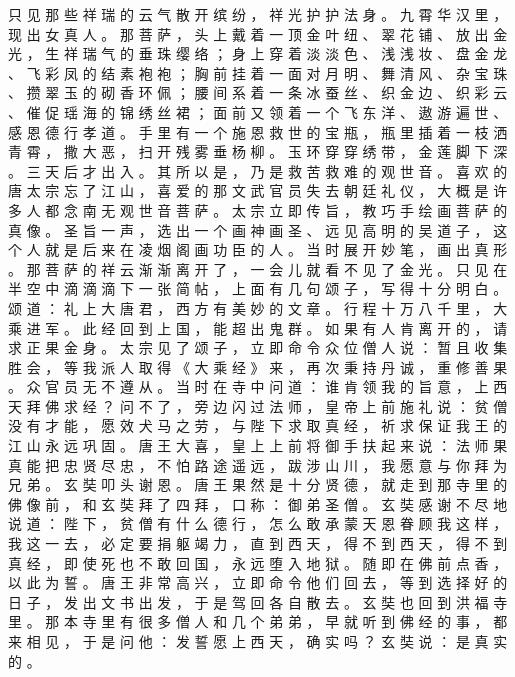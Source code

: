 {只 见 那 些 祥 瑞 的 云 气 散 开 缤 纷 ， 祥 光 护 护 法 身 。
九 霄 华 汉 里 ， 现 出 女 真 人 。
那 菩 萨 ， 头 上 戴 着 一 顶 金 叶 纽 、 翠 花 铺 、 放 出 金 光 ， 生 祥 瑞 气 的 垂 珠 缨 络 ； 身 上 穿 着 淡 淡 色 、 浅 浅 妆 、 盘 金 龙 、 飞 彩 凤 的 结 素 袍 袍 ； 胸 前 挂 着 一 面 对 月 明 、 舞 清 风 、 杂 宝 珠 、 攒 翠 玉 的 砌 香 环 佩 ； 腰 间 系 着 一 条 冰 蚕 丝 、 织 金 边 、 织 彩 云 、 催 促 瑶 海 的 锦 绣 丝 裙 ； 面 前 又 领 着 一 个 飞 东 洋 、 遨 游 遍 世 、 感 恩 德 行 孝 道 。
手 里 有 一 个 施 恩 救 世 的 宝 瓶 ， 瓶 里 插 着 一 枝 洒 青 霄 ， 撒 大 恶 ， 扫 开 残 雾 垂 杨 柳 。
玉 环 穿 穿 绣 带 ， 金 莲 脚 下 深 。
三 天 后 才 出 入 。
其 所 以 是 ， 乃 是 救 苦 救 难 的 观 世 音 。
喜 欢 的 唐 太 宗 忘 了 江 山 ， 喜 爱 的 那 文 武 官 员 失 去 朝 廷 礼 仪 ， 大 概 是 许 多 人 都 念 南 无 观 世 音 菩 萨 。
太 宗 立 即 传 旨 ， 教 巧 手 绘 画 菩 萨 的 真 像 。
圣 旨 一 声 ， 选 出 一 个 画 神 画 圣 、 远 见 高 明 的 吴 道 子 ， 这 个 人 就 是 后 来 在 凌 烟 阁 画 功 臣 的 人 。
当 时 展 开 妙 笔 ， 画 出 真 形 。
那 菩 萨 的 祥 云 渐 渐 离 开 了 ， 一 会 儿 就 看 不 见 了 金 光 。
只 见 在 半 空 中 滴 滴 滴 下 一 张 简 帖 ， 上 面 有 几 句 颂 子 ， 写 得 十 分 明 白 。
颂 道 ： 礼 上 大 唐 君 ， 西 方 有 美 妙 的 文 章 。
行 程 十 万 八 千 里 ， 大 乘 进 军 。
此 经 回 到 上 国 ， 能 超 出 鬼 群 。
如 果 有 人 肯 离 开 的 ， 请 求 正 果 金 身 。
太 宗 见 了 颂 子 ， 立 即 命 令 众 位 僧 人 说 ： 暂 且 收 集 胜 会 ， 等 我 派 人 取 得 《 大 乘 经 》 来 ， 再 次 秉 持 丹 诚 ， 重 修 善 果 。
众 官 员 无 不 遵 从 。
当 时 在 寺 中 问 道 ： 谁 肯 领 我 的 旨 意 ， 上 西 天 拜 佛 求 经 ？ 问 不 了 ， 旁 边 闪 过 法 师 ， 皇 帝 上 前 施 礼 说 ： 贫 僧 没 有 才 能 ， 愿 效 犬 马 之 劳 ， 与 陛 下 求 取 真 经 ， 祈 求 保 证 我 王 的 江 山 永 远 巩 固 。
唐 王 大 喜 ， 皇 上 上 前 将 御 手 扶 起 来 说 ： 法 师 果 真 能 把 忠 贤 尽 忠 ， 不 怕 路 途 遥 远 ， 跋 涉 山 川 ， 我 愿 意 与 你 拜 为 兄 弟 。
玄 奘 叩 头 谢 恩 。
唐 王 果 然 是 十 分 贤 德 ， 就 走 到 那 寺 里 的 佛 像 前 ， 和 玄 奘 拜 了 四 拜 ， 口 称 ： 御 弟 圣 僧 。
玄 奘 感 谢 不 尽 地 说 道 ： 陛 下 ， 贫 僧 有 什 么 德 行 ， 怎 么 敢 承 蒙 天 恩 眷 顾 我 这 样 ， 我 这 一 去 ， 必 定 要 捐 躯 竭 力 ， 直 到 西 天 ， 得 不 到 西 天 ， 得 不 到 真 经 ， 即 使 死 也 不 敢 回 国 ， 永 远 堕 入 地 狱 。
随 即 在 佛 前 点 香 ， 以 此 为 誓 。
唐 王 非 常 高 兴 ， 立 即 命 令 他 们 回 去 ， 等 到 选 择 好 的 日 子 ， 发 出 文 书 出 发 ， 于 是 驾 回 各 自 散 去 。
玄 奘 也 回 到 洪 福 寺 里 。
那 本 寺 里 有 很 多 僧 人 和 几 个 弟 弟 ， 早 就 听 到 佛 经 的 事 ， 都 来 相 见 ， 于 是 问 他 ： 发 誓 愿 上 西 天 ， 确 实 吗 ？ 玄 奘 说 ： 是 真 实 的 。
}
